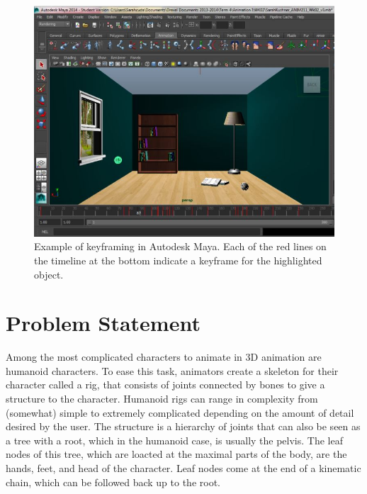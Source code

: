 \begin{figure}[h!]
\centering
\includegraphics[scale=0.47]{img/keyframe}
\caption{Example of keyframing in Autodesk Maya. Each of the red lines on the timeline at the bottom indicate a keyframe for the highlighted object.}
\label{fig:keyframes}
\end{figure}

\section{Problem Statement}

Among the most complicated characters to animate in 3D animation are humanoid characters. To ease this task, animators create a skeleton for their character called a rig, that consists of joints connected by bones to give a structure to the character. Humanoid rigs can range in complexity from (somewhat) simple to extremely complicated depending on the amount of detail desired by the user. The structure is a hierarchy of joints that can also be seen as a tree with a root, which in the humanoid case, is usually the pelvis. The leaf nodes of this tree, which are loacted at the maximal parts of the body, are the hands, feet, and head of the character. Leaf nodes come at the end of a kinematic chain, which can be followed back up to the root.


